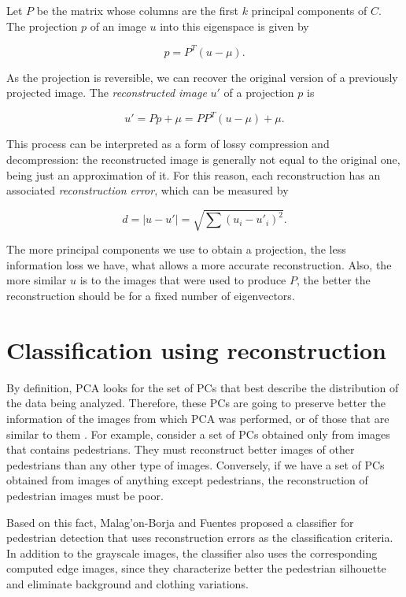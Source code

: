 \documentclass[10pt, conference, compsocconf]{IEEEtran}
\begin{document}
Let $P$ be the matrix whose columns are the first $k$ principal components of $C$. The projection $p$ of an image $u$ into this eigenspace is given by

\begin{equation}
  p = P^T (u - \mu).
\end{equation}

\noindent As the projection is reversible, we can recover the original version of a previously projected image. The \emph{reconstructed image} $u'$ of a projection $p$ is

\begin{equation}
  u' = Pp + \mu = PP^T(u - \mu) + \mu.
\end{equation}

\noindent This process can be interpreted as a form of lossy compression and decompression: the reconstructed image is generally not equal to the original one, being just an approximation of it. For this reason, each reconstruction has an associated \emph{reconstruction error}, which can be measured by

\begin{equation}
  d = |u - u'| = \sqrt{\sum{(u_i - u'_i)^2}}.
\end{equation}

The more principal components we use to obtain a projection, the less information loss we have, what allows a more accurate reconstruction. Also, the more similar $u$ is to the images that were used to produce $P$, the better the reconstruction should be for a fixed number of eigenvectors.


\section{Classification using reconstruction}

By definition, PCA looks for the set of PCs that best describe the distribution of the data being analyzed. Therefore, these PCs are going to preserve better the information of the images from which PCA was performed, or of those that are similar to them \cite{borja09}. For example, consider a set of PCs obtained only from images that contains pedestrians. They must reconstruct better images of other pedestrians than any other type of images. Conversely, if we have a set of PCs obtained from images of anything except pedestrians, the reconstruction of pedestrian images must be poor.

Based on this fact, Malag'{o}n-Borja and Fuentes \cite{borja09} proposed a classifier for pedestrian detection that uses reconstruction errors as the classification criteria. In addition to the grayscale images, the classifier also uses the corresponding computed edge images, since they characterize better the pedestrian silhouette and eliminate background and clothing variations. 
\end{document}
